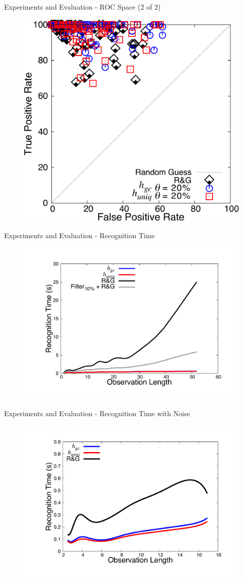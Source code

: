 \documentclass{beamer}
\begin{document}
\begin{frame}{Experiments and Evaluation - ROC Space (2 of 2)}	
	\begin{figure}[here]
		\centering
		\includegraphics[width=0.6\linewidth]{fig/rocspace-all_domains.pdf}
	\end{figure}
\end{frame}

\begin{frame}{Experiments and Evaluation - Recognition Time}
	\begin{figure}[here]
		\centering
		\includegraphics[width=0.7\linewidth]{fig/missing-recognition_time.pdf}
	\end{figure}
\end{frame}

\begin{frame}{Experiments and Evaluation - Recognition Time with Noise}
	\begin{figure}[here]
		\centering
		\includegraphics[width=0.7\linewidth]{fig/noisy-recognition_time.pdf}
	\end{figure}
\end{frame}
	
\end{document}
